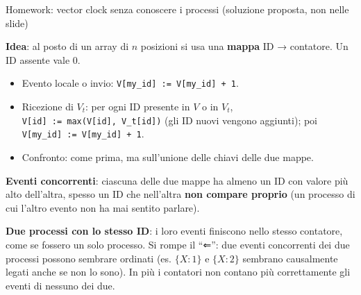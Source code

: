 \begin{approfondimento}{Homework: vector clock senza conoscere i processi (soluzione proposta,
non nelle slide)}

\textbf{Idea}: al posto di un array di \(n\) posizioni si usa una \textbf{mappa} ID → contatore. Un ID assente vale 0.

\begin{itemize}
\tightlist
\item
  Evento locale o invio: \texttt{V{[}my\_id{]}\ :=\ V{[}my\_id{]}\ +\ 1}.
\item
  Ricezione di \(V_t\): per ogni ID presente in \(V\) o in \(V_t\), \texttt{V{[}id{]}\ :=\ max(V{[}id{]},\ V\_t{[}id{]})} (gli ID nuovi vengono aggiunti); poi \texttt{V{[}my\_id{]}\ :=\ V{[}my\_id{]}\ +\ 1}.
\item
  Confronto: come prima, ma sull'unione delle chiavi delle due mappe.
\end{itemize}

\textbf{Eventi concorrenti}: ciascuna delle due mappe ha almeno un ID con valore più alto dell'altra, spesso un ID che nell'altra \textbf{non compare proprio} (un processo di cui l'altro evento non ha mai sentito parlare).

\textbf{Due processi con lo stesso ID}: i loro eventi finiscono nello stesso contatore, come se fossero un solo processo. Si rompe il ``⇐'': due eventi concorrenti dei due processi possono sembrare ordinati (es. \(\{X:1\}\) e \(\{X:2\}\) sembrano causalmente legati anche se non lo sono). In più i contatori non contano più correttamente gli eventi di nessuno dei due.

\end{approfondimento}

